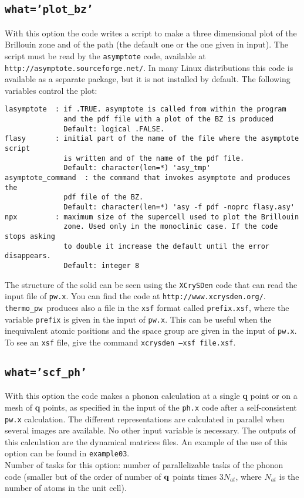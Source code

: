 \documentclass[12pt,a4paper]{article}
\def\thermo{\texttt{thermo\_pw}}
\begin{document}
\subsection{\texttt{what='plot\_bz'}}
With this option the code writes a script to make a three dimensional plot
of the Brillouin zone and of the path (the default one or the one given in 
input). 
The script must be read by the \texttt{asymptote} code, available at 
\texttt{http://asymptote.sourceforge.net/}. In many Linux distributions
this code is available as a separate package, but it is not installed by
default. The following variables control the plot:
\begin{verbatim}
lasymptote  : if .TRUE. asymptote is called from within the program
              and the pdf file with a plot of the BZ is produced
              Default: logical .FALSE.
flasy       : initial part of the name of the file where the asymptote script
              is written and of the name of the pdf file.
              Default: character(len=*) 'asy_tmp'
asymptote_command  : the command that invokes asymptote and produces the 
              pdf file of the BZ.
              Default: character(len=*) 'asy -f pdf -noprc flasy.asy'
npx         : maximum size of the supercell used to plot the Brillouin
              zone. Used only in the monoclinic case. If the code stops asking
              to double it increase the default until the error disappears.
              Default: integer 8
\end{verbatim}
The structure of the solid can be seen using the \texttt{XCrySDen} code
that can read the input file of \texttt{pw.x}. You can find the code at
\texttt{http://www.xcrysden.org/}. \thermo\ produces also a file in the
\texttt{xsf} format called \texttt{prefix.xsf}, where the variable 
\texttt{prefix}
is given in the input of \texttt{pw.x}. This can be useful when
the inequivalent atomic positions and the space group are given in the input
of \texttt{pw.x}. To see an \texttt{xsf} file, give the command
\texttt{xcrysden --xsf file.xsf}.

\subsection{\texttt{what='scf\_ph'}}
With this option the code makes a phonon calculation at a single {\bf q} 
point or on a mesh of {\bf q} points, as specified in the input of 
the \texttt{ph.x} code after a self-consistent \texttt{pw.x} calculation. 
The different representations are calculated in parallel when several images 
are available. No other input variable is necessary. The outputs of this 
calculation are the dynamical matrices files.
An example of the use of this option can be found in \texttt{example03}. \\
Number of tasks for this option: number of parallelizable tasks of the 
phonon code (smaller but of the order of number of ${\bf q}$ points times 
$3 N_{at}$, where $N_{at}$ is the number of atoms in the unit cell).
\end{document}
